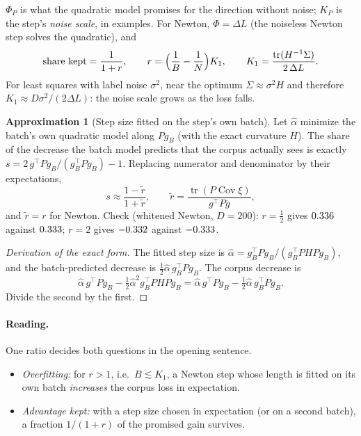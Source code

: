 \documentclass[11pt,a4paper]{article}
\DeclareMathOperator{\tr}{tr}
\theoremstyle{plain}
\theoremstyle{definition}
\newtheorem{approximation}[proposition]{Approximation}
\theoremstyle{remark}
\begin{document}
$\Phi_P$ is what the quadratic model promises for the direction without noise; $K_P$ is the step's
\emph{noise scale}, in examples. For Newton, $\Phi=\Delta L$ (the noiseless Newton step solves the quadratic), and
\[
\text{share kept}=\frac{1}{1+r},\qquad r=\Bigl(\frac1B-\frac1N\Bigr)K_1,\qquad K_1=\frac{\tr(H^{-1}\Sigma)}{2\,\Delta L}.
\]
For least squares with label noise $\sigma^2$, near the optimum $\Sigma\approx\sigma^2H$ and therefore
$K_1\approx D\sigma^2/(2\Delta L)$: the noise scale grows as the loss falls.

\begin{approximation}[Step size fitted on the step's own batch]\label{approx:share}
Let $\hat\alpha$ minimize the batch's own quadratic model along $Pg_B$ (with the exact curvature $H$). The share of
the decrease the batch model predicts that the corpus actually sees is exactly
$s=2\,g^\top Pg_B/(g_B^\top Pg_B)-1$. Replacing numerator and denominator by their expectations,
\[
s\approx\frac{1-\tilde r}{1+\tilde r},\qquad \tilde r=\frac{\tr(P\operatorname{Cov}\xi)}{g^\top Pg},
\]
and $\tilde r=r$ for Newton. Check (whitened Newton, $D=200$): $r=\tfrac12$ gives $0.336$ against
$0.333$; $r=2$ gives $-0.332$ against $-0.333$.
\end{approximation}
\begin{proof}[Derivation of the exact form]
The fitted step size is $\hat\alpha=g_B^\top Pg_B/(g_B^\top PHPg_B)$, and the batch-predicted decrease is
$\frac12\hat\alpha\,g_B^\top Pg_B$. The corpus decrease is
\[
\hat\alpha\,g^\top Pg_B-\tfrac12\hat\alpha^2g_B^\top PHPg_B=\hat\alpha\,g^\top Pg_B-\tfrac12\hat\alpha\,g_B^\top Pg_B .
\]
Divide the second by the first.
\end{proof}

\paragraph{Reading.} One ratio decides both questions in the opening sentence.
\begin{itemize}[nosep]
\item \emph{Overfitting:} for $r>1$, i.e.\ $B\lesssim K_1$, a Newton step whose length is fitted on its own batch
  \emph{increases} the corpus loss in expectation.
\item \emph{Advantage kept:} with a step size chosen in expectation (or on a second batch), a fraction $1/(1+r)$ of
  the promised gain survives.
\end{itemize}
\end{document}
